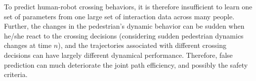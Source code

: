 \documentclass[conference]{IEEEtran}
\begin{document}
To predict human-robot crossing behaviors, it is therefore insufficient to learn
one set of parameters from one large set of interaction data across many people. 
Further, the changes in the pedestrian's dynamic behavior can be sudden when he/she react 
to the crossing decisions (considering 
sudden pedestrian dynamics changes at time $n$), and the 
trajectories associated with different crossing decisions can have largely 
different dynamical performance. Therefore, false 
prediction can much deteriorate the joint path efficiency, and possibly the 
safety criteria. 





\end{document}
